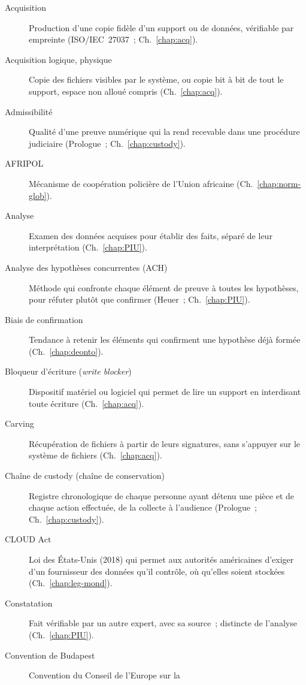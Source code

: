 \begin{description}
    \item[Acquisition] Production d'une copie fidèle d'un support ou de données,
          vérifiable par empreinte (ISO/IEC~27037~; Ch.~\ref{chap:acq}).
    \item[Acquisition logique, physique] Copie des fichiers visibles par le
          système, ou copie bit à bit de tout le support, espace non alloué
          compris (Ch.~\ref{chap:acq}).
    \item[Admissibilité] Qualité d'une preuve numérique qui la rend recevable
          dans une procédure judiciaire (Prologue~; Ch.~\ref{chap:custody}).
    \item[AFRIPOL] Mécanisme de coopération policière de l'Union africaine
          (Ch.~\ref{chap:norm-glob}).
    \item[Analyse] Examen des données acquises pour établir des faits,
          séparé de leur interprétation (Ch.~\ref{chap:PIU}).
    \item[Analyse des hypothèses concurrentes (ACH)] Méthode qui confronte
          chaque élément de preuve à toutes les hypothèses, pour réfuter
          plutôt que confirmer (Heuer~; Ch.~\ref{chap:PIU}).
    \item[Biais de confirmation] Tendance à retenir les éléments qui
          confirment une hypothèse déjà formée (Ch.~\ref{chap:deonto}).
    \item[Bloqueur d'écriture (\textit{write blocker})] Dispositif matériel ou
          logiciel qui permet de lire un support en interdisant toute écriture
          (Ch.~\ref{chap:acq}).
    \item[Carving] Récupération de fichiers à partir de leurs signatures,
          sans s'appuyer sur le système de fichiers (Ch.~\ref{chap:acq}).
    \item[Chaîne de custody (chaîne de conservation)] Registre chronologique
          de chaque personne ayant détenu une pièce et de chaque action
          effectuée, de la collecte à l'audience (Prologue~;
          Ch.~\ref{chap:custody}).
    \item[CLOUD Act] Loi des États-Unis (2018) qui permet aux autorités
          américaines d'exiger d'un fournisseur des données qu'il contrôle,
          où qu'elles soient stockées (Ch.~\ref{chap:leg-mond}).
    \item[Constatation] Fait vérifiable par un autre expert, avec sa source~;
          distincte de l'analyse (Ch.~\ref{chap:PIU}).
    \item[Convention de Budapest] Convention du Conseil de l'Europe sur la

\end{description}
